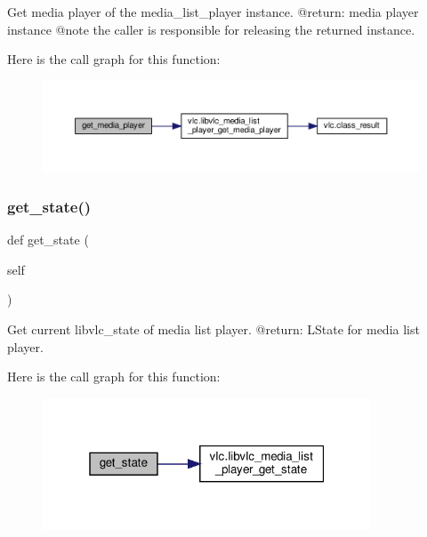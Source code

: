 \begin{DoxyVerb}Get media player of the media_list_player instance.
@return: media player instance @note the caller is responsible for releasing the returned instance.
\end{DoxyVerb}
 Here is the call graph for this function\+:
\nopagebreak
\begin{figure}[H]
\begin{center}
\leavevmode
\includegraphics[width=350pt]{classvlc_1_1_media_list_player_a19740d569e3e3e0dd5f94695cd2a34f0_cgraph}
\end{center}
\end{figure}
\mbox{\label{classvlc_1_1_media_list_player_adf1f4fd59e6ea40d38c2b677a757007f}} 
\subsubsection{\texorpdfstring{get\+\_\+state()}{get\_state()}}
{\footnotesize\ttfamily def get\+\_\+state (\begin{DoxyParamCaption}\item[{}]{self }\end{DoxyParamCaption})}

\begin{DoxyVerb}Get current libvlc_state of media list player.
@return: L{State} for media list player.
\end{DoxyVerb}
 Here is the call graph for this function\+:
\nopagebreak
\begin{figure}[H]
\begin{center}
\leavevmode
\includegraphics[width=277pt]{classvlc_1_1_media_list_player_adf1f4fd59e6ea40d38c2b677a757007f_cgraph}
\end{center}
\end{figure}
\mbox{\label{classvlc_1_1_media_list_player_a48c6394263dfdf45970dbd872d52c8d8}} 
